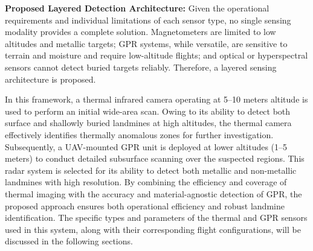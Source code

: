 \textbf{Proposed Layered Detection Architecture:} Given the operational requirements and individual limitations of each sensor type, no single sensing modality provides a complete solution. Magnetometers are limited to low altitudes and metallic targets; GPR systems, while versatile, are sensitive to terrain and moisture and require low-altitude flights; and optical or hyperspectral sensors cannot detect buried targets reliably. Therefore, a layered sensing architecture is proposed.

In this framework, a thermal infrared camera operating at 5--10 meters altitude is used to perform an initial wide-area scan. Owing to its ability to detect both surface and shallowly buried landmines at high altitudes, the thermal camera effectively identifies thermally anomalous zones for further investigation. Subsequently, a UAV-mounted GPR unit is deployed at lower altitudes (1--5 meters) to conduct detailed subsurface scanning over the suspected regions. This radar system is selected for its ability to detect both metallic and non-metallic landmines with high resolution. By combining the efficiency and coverage of thermal imaging with the accuracy and material-agnostic detection of GPR, the proposed approach ensures both operational efficiency and robust landmine identification. The specific types and parameters of the thermal and GPR sensors used in this system, along with their corresponding flight configurations, will be discussed in the following sections.